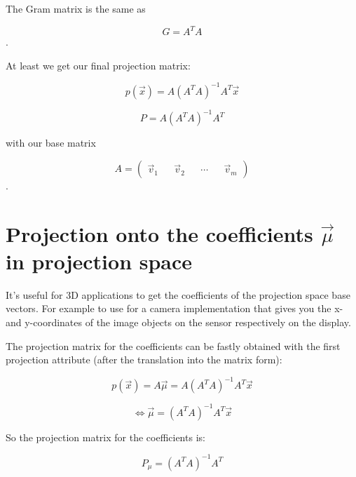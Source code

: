 \documentclass{article}
\begin{document}
The Gram matrix is the same as

    \begin{equation}
        G = A^T A
    \end{equation}.

At least we get our final projection matrix:

    \begin{equation}
        p(\vec{x}) = A(A^T A)^{-1} A^T \vec{x}
    \end{equation}

    \begin{equation}
        P = A(A^T A)^{-1} A^T
    \end{equation}

with our base matrix

    \begin{equation}
        A = \begin{pmatrix} \vec{v}_1 && \vec{v}_2 && \cdots && \vec{v}_m
        \end{pmatrix}
    \end{equation}.

\section{Projection onto the coefficients \(\vec{\mu}\) in projection space}

It's useful for 3D applications to get the coefficients of the projection space
base vectors. For example to use for a camera implementation that gives you the
x- and y-coordinates of the image objects on the sensor respectively on the
display.

The projection matrix for the coefficients can be fastly obtained with the first
projection attribute (after the translation into the matrix form):

    \begin{equation}
        p(\vec{x}) = A \vec{\mu} = A(A^T A)^{-1} A^T \vec{x}
    \end{equation}

    \begin{equation}
        \iff \vec{\mu} = (A^T A)^{-1} A^T \vec{x}
    \end{equation}

So the projection matrix for the coefficients is:

    \begin{equation}
        P_{\mu} = (A^T A)^{-1} A^T
    \end{equation}
\end{document}
